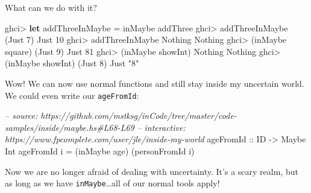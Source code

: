 \documentclass[]{article}
\newenvironment{Shaded}{}{}
\newcommand{\KeywordTok}[1]{\textcolor[rgb]{0.00,0.44,0.13}{\textbf{#1}}}
\newcommand{\DataTypeTok}[1]{\textcolor[rgb]{0.56,0.13,0.00}{#1}}
\newcommand{\DecValTok}[1]{\textcolor[rgb]{0.25,0.63,0.44}{#1}}
\newcommand{\StringTok}[1]{\textcolor[rgb]{0.25,0.44,0.63}{#1}}
\newcommand{\CommentTok}[1]{\textcolor[rgb]{0.38,0.63,0.69}{\textit{#1}}}
\newcommand{\OtherTok}[1]{\textcolor[rgb]{0.00,0.44,0.13}{#1}}
\newcommand{\FunctionTok}[1]{\textcolor[rgb]{0.02,0.16,0.49}{#1}}
\newcommand{\NormalTok}[1]{#1}
\begin{document}
What can we do with it?

\begin{Shaded}
\begin{Highlighting}[]
\NormalTok{ghci}\FunctionTok{>} \KeywordTok{let}\NormalTok{ addThreeInMaybe }\FunctionTok{=}\NormalTok{ inMaybe addThree}
\NormalTok{ghci}\FunctionTok{>}\NormalTok{ addThreeInMaybe (}\DataTypeTok{Just} \DecValTok{7}\NormalTok{)}
\DataTypeTok{Just} \DecValTok{10}
\NormalTok{ghci}\FunctionTok{>}\NormalTok{ addThreeInMaybe }\DataTypeTok{Nothing}
\DataTypeTok{Nothing}
\NormalTok{ghci}\FunctionTok{>}\NormalTok{ (inMaybe square) (}\DataTypeTok{Just} \DecValTok{9}\NormalTok{)}
\DataTypeTok{Just} \DecValTok{81}
\NormalTok{ghci}\FunctionTok{>}\NormalTok{ (inMaybe showInt) }\DataTypeTok{Nothing}
\DataTypeTok{Nothing}
\NormalTok{ghci}\FunctionTok{>}\NormalTok{ (inMaybe showInt) (}\DataTypeTok{Just} \DecValTok{8}\NormalTok{)}
\DataTypeTok{Just} \StringTok{"8"}
\end{Highlighting}
\end{Shaded}

Wow! We can now use normal functions and still stay inside my uncertain world.
We could even write our \texttt{ageFromId}:

\begin{Shaded}
\begin{Highlighting}[]
\CommentTok{-- source: https://github.com/mstksg/inCode/tree/master/code-samples/inside/maybe.hs#L68-L69}
\CommentTok{-- interactive: https://www.fpcomplete.com/user/jle/inside-my-world}
\OtherTok{ageFromId ::} \DataTypeTok{ID} \OtherTok{->} \DataTypeTok{Maybe} \DataTypeTok{Int}
\NormalTok{ageFromId i }\FunctionTok{=}\NormalTok{ (inMaybe age) (personFromId i)}
\end{Highlighting}
\end{Shaded}

Now we are no longer afraid of dealing with uncertainty. It's a scary realm, but
as long as we have \texttt{inMaybe}\ldots{}all of our normal tools apply!
\end{document}
